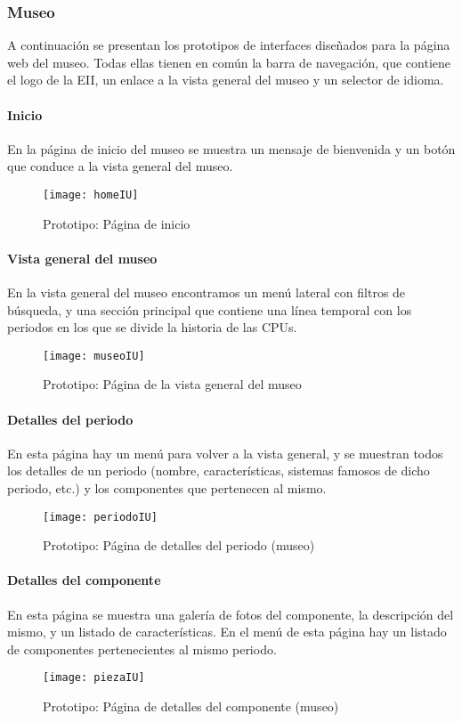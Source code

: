 \subsubsection{Museo}
A continuación se presentan los prototipos de interfaces diseñados para la página web del museo. Todas ellas tienen en común la barra de navegación, que contiene el logo de la EII, un enlace a la vista general del museo y un selector de idioma.
\paragraph*{Inicio}
En la página de inicio del museo se muestra un mensaje de bienvenida y un botón que conduce a la vista general del museo.
\begin{figure}[H]
\centering
\texttt{[image: homeIU]}
\caption{Prototipo: Página de inicio}
\end{figure}
\paragraph*{Vista general del museo}\label{iu:timeline}
En la vista general del museo encontramos un menú lateral con filtros de búsqueda, y una sección principal que contiene una línea temporal con los periodos en los que se divide la historia de las CPUs.
\begin{figure}[H]
\centering
\texttt{[image: museoIU]}
\caption{Prototipo: Página de la vista general del museo}
\end{figure}
\paragraph*{Detalles del periodo}\label{iu:period-details}
En esta página hay un menú para volver a la vista general, y se muestran todos los detalles de un periodo (nombre, características, sistemas famosos de dicho periodo, etc.) y los componentes que pertenecen al mismo. 
\begin{figure}[H]
\centering
\texttt{[image: periodoIU]}
\caption{Prototipo: Página de detalles del periodo (museo)}
\end{figure}
\paragraph*{Detalles del componente}\label{iu:comp-details}
En esta página se muestra una galería de fotos del componente, la descripción del mismo, y un listado de características. En el menú de esta página hay un listado de componentes pertenecientes al mismo periodo.
\begin{figure}[H]
\centering
\texttt{[image: piezaIU]}
\caption{Prototipo: Página de detalles del componente (museo)}
\end{figure}

